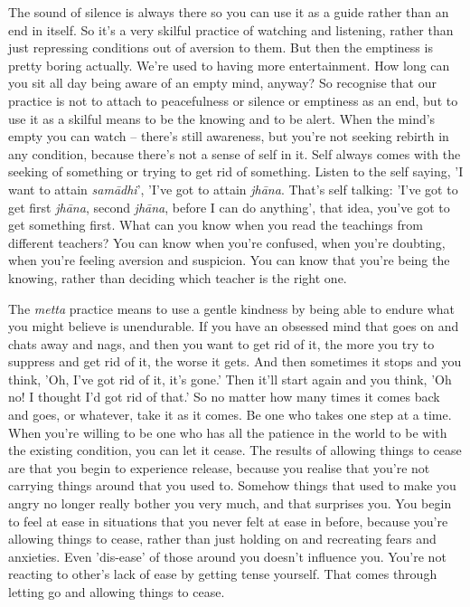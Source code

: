 The sound of silence is always there so you can use it as a guide rather than an end in itself. So it's a very skilful practice of watching and listening, rather than just repressing conditions out of aversion to them. But then the emptiness is pretty boring actually. We're used to having more entertainment. How long can you sit all day being aware of an empty mind, anyway? So recognise that our practice is not to attach to peacefulness or silence or emptiness as an end, but to use it as a skilful means to be the knowing and to be alert. When the mind's empty you can watch -- there's still awareness, but you're not seeking rebirth in any condition, because there's not a sense of self in it. Self always comes with the seeking of something or trying to get rid of something. Listen to the self saying, 'I want to attain \textit{sam\=adhi}', 'I've got to attain \textit{jh\=ana}. That's self talking: 'I've got to get first \textit{jh\=ana}, second \textit{jh\=ana}, before I can do anything', that idea, you've got to get something first. What can you know when you read the teachings from different teachers? You can know when you're confused, when you're doubting, when you're feeling aversion and suspicion. You can know that you're being the knowing, rather than deciding which teacher is the right one.

The \textit{metta} practice means to use a gentle kindness by being able to endure what you might believe is unendurable. If you have an obsessed mind that goes on and chats away and nags, and then you want to get rid of it, the more you try to suppress and get rid of it, the worse it gets. And then sometimes it stops and you think, 'Oh, I've got rid of it, it's gone.' Then it'll start again and you think, 'Oh no! I thought I'd got rid of that.' So no matter how many times it comes back and goes, or whatever, take it as it comes. Be one who takes one step at a time. When you're willing to be one who has all the patience in the world to be with the existing condition, you can let it cease. The results of allowing things to cease are that you begin to experience release, because you realise that you're not carrying things around that you used to. Somehow things that used to make you angry no longer really bother you very much, and that surprises you. You begin to feel at ease in situations that you never felt at ease in before, because you're allowing things to cease, rather than just holding on and recreating fears and anxieties. Even 'dis-ease' of those around you doesn't influence you. You're not reacting to other's lack of ease by getting tense yourself. That comes through letting go and allowing things to cease.

